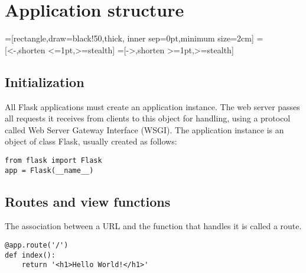 
\chapter{Application structure}
\label{cha:appl-struct}

\usetikzlibrary{arrows,snakes,backgrounds}
=[rectangle,draw=black!50,thick, inner sep=0pt,minimum size=2cm]
=[<-,shorten <=1pt,>=stealth]
=[->,shorten >=1pt,>=stealth]


\section{Initialization}
\label{sec:initialization}

All Flask applications must create an application instance.
The web server passes all requests it receives from clients to this object for handling, using a protocol called Web Server Gateway Interface (WSGI).
The application instance is an object of class Flask, usually created as follows:
\begin{lstlisting}
from flask import Flask
app = Flask(__name__)
\end{lstlisting}

\section{Routes and view functions}
\label{sec:rout-view-funct}

The association between a URL and the function that handles it is called a route.
\begin{lstlisting}
@app.route('/')
def index():
    return '<h1>Hello World!</h1>'
\end{lstlisting}



